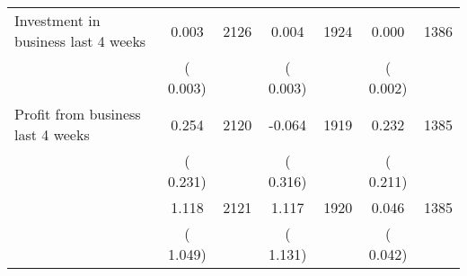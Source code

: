 \begin{tabular}{l*{6}{c}}
Investment in business last 4 weeks        &              0.003      &       2126       &              0.004      &       1924       &              0.000      &       1386       \\
                       &       (       0.003)            &                               &       (       0.003)            &                               &       (       0.002)            &                               \\
Profit from business last 4 weeks        &              0.254      &       2120       &             -0.064      &       1919       &              0.232      &       1385       \\
                       &       (       0.231)            &                               &       (       0.316)            &                               &       (       0.211)            &                               \\
        &              1.118      &       2121       &              1.117      &       1920       &              0.046      &       1385       \\
                       &       (       1.049)            &                               &       (       1.131)            &                               &       (       0.042)            &                               \\
\hline \end{tabular}

